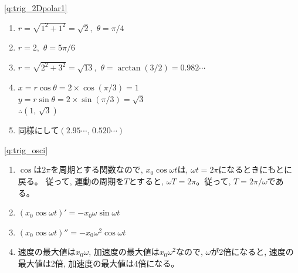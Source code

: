 \ref{q:trig_2Dpolar1} 
\begin{enumerate}
\item $r=\sqrt{1^{2}+1^{2}}=\sqrt{2},\,\, \theta=\pi/4$
\item $r=2,\,\, \theta=5\pi/6$
\item $r=\sqrt{2^2+3^2}=\sqrt{13},\,\, \theta=\arctan(3/2)=0.982\cdots$
\item $x=r\cos{\theta}=2 \times \cos(\pi/3) = 1$\\
       $y=r\sin{\theta}=2 \times \sin(\pi/3) = \sqrt{3}$\\
       $\therefore (1, \, \sqrt{3})$
\item 同様にして$(2.95\cdots, \, 0.520\cdots)$
\end{enumerate}
\mv

%
\ref{q:trig_osci} 
\begin{enumerate}
\item $\cos$は$2\pi$を周期とする関数なので, $x_0\cos \omega t$は, $\omega t= 2\pi$になるときにもとに戻る。
従って, 運動の周期を$T$とすると, $\omega T=2\pi$。従って, $T=2\pi/\omega$である。
\item $(x_0\cos \omega t)'=-x_0\omega \sin{\omega t}$
\item $(x_0\cos \omega t)''=-x_0\omega^2 \cos{\omega t}$
\item 速度の最大値は$x_0\omega$, 加速度の最大値は$x_0\omega^2$なので, $\omega$が2倍になると, 
速度の最大値は2倍, 加速度の最大値は4倍になる。
\end{enumerate}

